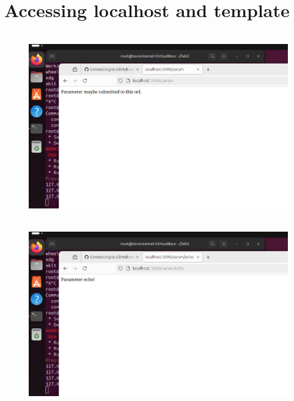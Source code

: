 \documentclass[letterpaper,11pt]{texMemo2} %
\begin{document}
	\section{Accessing localhost and template}
	\begin{figure}[htp]
		\centering 
		
			\includegraphics[clip,width=0.9\columnwidth,height=8cm]{10A}%
		\\
		
		
			\includegraphics[clip,width=0.9\columnwidth,height=8cm]{10C}%
		
		
		
		
	\end{figure}
	
	
	
\end{document}
